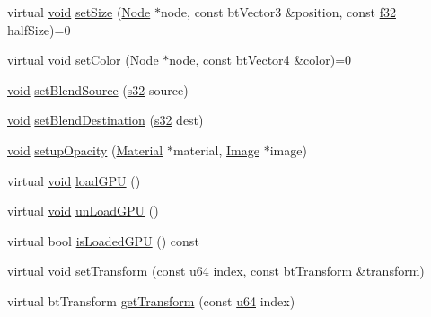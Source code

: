 \begin{DoxyCompactItemize}
\item 
virtual \mbox{\hyperlink{_thread_8h_af1e856da2e658414cb2456cb6f7ebc66}{void}} \mbox{\hyperlink{classnjli_1_1_geometry_a64c12722f84add665776c2b9400108fd}{set\+Size}} (\mbox{\hyperlink{classnjli_1_1_node}{Node}} $\ast$node, const bt\+Vector3 \&position, const \mbox{\hyperlink{_util_8h_a5f6906312a689f27d70e9d086649d3fd}{f32}} half\+Size)=0
\item 
virtual \mbox{\hyperlink{_thread_8h_af1e856da2e658414cb2456cb6f7ebc66}{void}} \mbox{\hyperlink{classnjli_1_1_geometry_a6ba967a65603a7660ab63fe067e338b4}{set\+Color}} (\mbox{\hyperlink{classnjli_1_1_node}{Node}} $\ast$node, const bt\+Vector4 \&color)=0
\item 
\mbox{\hyperlink{_thread_8h_af1e856da2e658414cb2456cb6f7ebc66}{void}} \mbox{\hyperlink{classnjli_1_1_geometry_a52a0a0310a248e03f8b6c410ca0f3fae}{set\+Blend\+Source}} (\mbox{\hyperlink{_util_8h_aa62c75d314a0d1f37f79c4b73b2292e2}{s32}} source)
\item 
\mbox{\hyperlink{_thread_8h_af1e856da2e658414cb2456cb6f7ebc66}{void}} \mbox{\hyperlink{classnjli_1_1_geometry_ac8524641c3a7273902e2028ef6836503}{set\+Blend\+Destination}} (\mbox{\hyperlink{_util_8h_aa62c75d314a0d1f37f79c4b73b2292e2}{s32}} dest)
\item 
\mbox{\hyperlink{_thread_8h_af1e856da2e658414cb2456cb6f7ebc66}{void}} \mbox{\hyperlink{classnjli_1_1_geometry_a6c736d40f50aa200248ff2fffe362446}{setup\+Opacity}} (\mbox{\hyperlink{classnjli_1_1_material}{Material}} $\ast$material, \mbox{\hyperlink{classnjli_1_1_image}{Image}} $\ast$image)
\item 
virtual \mbox{\hyperlink{_thread_8h_af1e856da2e658414cb2456cb6f7ebc66}{void}} \mbox{\hyperlink{classnjli_1_1_geometry_a3242e657cbb5914f8f29ba6dbe21ef89}{load\+G\+PU}} ()
\item 
virtual \mbox{\hyperlink{_thread_8h_af1e856da2e658414cb2456cb6f7ebc66}{void}} \mbox{\hyperlink{classnjli_1_1_geometry_a1c7f801932e981d35c18acd5bf11c8c4}{un\+Load\+G\+PU}} ()
\item 
virtual bool \mbox{\hyperlink{classnjli_1_1_geometry_a29ac09a7f5ea68c26a410a03b8a58e16}{is\+Loaded\+G\+PU}} () const
\item 
virtual \mbox{\hyperlink{_thread_8h_af1e856da2e658414cb2456cb6f7ebc66}{void}} \mbox{\hyperlink{classnjli_1_1_geometry_a728c03769da533f7ca74fc967582b632}{set\+Transform}} (const \mbox{\hyperlink{_util_8h_ad758b7a5c3f18ed79d2fcd23d9f16357}{u64}} index, const bt\+Transform \&transform)
\item 
virtual bt\+Transform \mbox{\hyperlink{classnjli_1_1_geometry_acf510a790969aae6641ae068f1d804ea}{get\+Transform}} (const \mbox{\hyperlink{_util_8h_ad758b7a5c3f18ed79d2fcd23d9f16357}{u64}} index)

\end{DoxyCompactItemize}
